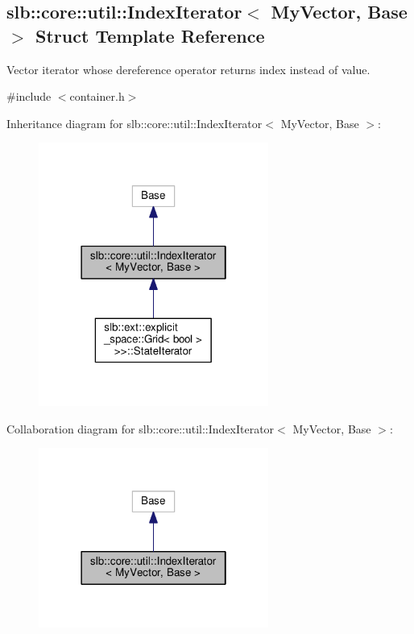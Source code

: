 \hypertarget{structslb_1_1core_1_1util_1_1IndexIterator}{}\subsection{slb\+:\+:core\+:\+:util\+:\+:Index\+Iterator$<$ My\+Vector, Base $>$ Struct Template Reference}
\label{structslb_1_1core_1_1util_1_1IndexIterator}


Vector iterator whose dereference operator returns index instead of value.  




{\ttfamily \#include $<$container.\+h$>$}



Inheritance diagram for slb\+:\+:core\+:\+:util\+:\+:Index\+Iterator$<$ My\+Vector, Base $>$\+:\nopagebreak
\begin{figure}[H]
\begin{center}
\leavevmode
\includegraphics[width=214pt]{structslb_1_1core_1_1util_1_1IndexIterator__inherit__graph}
\end{center}
\end{figure}


Collaboration diagram for slb\+:\+:core\+:\+:util\+:\+:Index\+Iterator$<$ My\+Vector, Base $>$\+:\nopagebreak
\begin{figure}[H]
\begin{center}
\leavevmode
\includegraphics[width=214pt]{structslb_1_1core_1_1util_1_1IndexIterator__coll__graph}
\end{center}
\end{figure}
